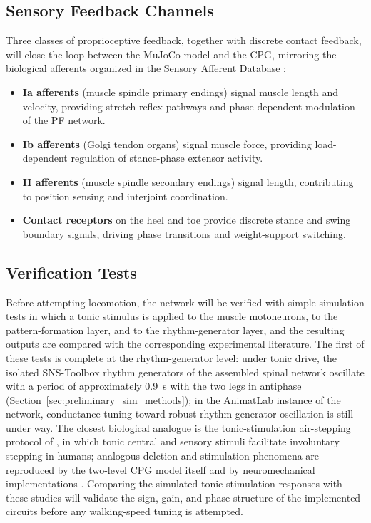 \subsection{Sensory Feedback Channels}

Three classes of proprioceptive feedback, together with discrete contact feedback, will close the loop between the MuJoCo model and the CPG, mirroring the biological afferents organized in the Sensory Afferent Database \citep{bolen_sensory_2023}:

\begin{itemize}
    \item \textbf{Ia afferents} (muscle spindle primary endings) signal muscle length and velocity, providing stretch reflex pathways and phase-dependent modulation of the PF network.
    \item \textbf{Ib afferents} (Golgi tendon organs) signal muscle force, providing load-dependent regulation of stance-phase extensor activity.
    \item \textbf{II afferents} (muscle spindle secondary endings) signal length, contributing to position sensing and interjoint coordination.
    \item \textbf{Contact receptors} on the heel and toe provide discrete stance and swing boundary signals, driving phase transitions and weight-support switching.
\end{itemize}

\subsection{Verification Tests}

Before attempting locomotion, the network will be verified with simple simulation tests in which a tonic stimulus is applied to the muscle motoneurons, to the pattern-formation layer, and to the rhythm-generator layer, and the resulting outputs are compared with the corresponding experimental literature. The first of these tests is complete at the rhythm-generator level: under tonic drive, the isolated SNS-Toolbox rhythm generators of the assembled spinal network oscillate with a period of approximately \qty{0.9}{\second} with the two legs in antiphase (Section~\ref{sec:preliminary_sim_methods}); in the AnimatLab instance of the network, conductance tuning toward robust rhythm-generator oscillation is still under way. The closest biological analogue is the tonic-stimulation air-stepping protocol of \citet{selionov_tonic_2009}, in which tonic central and sensory stimuli facilitate involuntary stepping in humans; analogous deletion and stimulation phenomena are reproduced by the two-level CPG model itself \citep{rybak_modelling_2006} and by neuromechanical implementations \citep{markin_afferent_2010, shevtsova_modeling_2016}. Comparing the simulated tonic-stimulation responses with these studies will validate the sign, gain, and phase structure of the implemented circuits before any walking-speed tuning is attempted.

